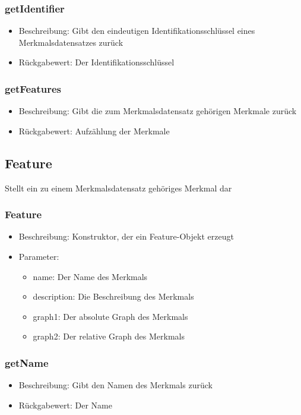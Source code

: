 \documentclass[a4paper]{scrreprt}
\begin{document}
	\subsubsection{getIdentifier}
	\begin{itemize}
		\item Beschreibung: Gibt den eindeutigen Identifikationsschlüssel eines Merkmalsdatensatzes zurück
		\item Rückgabewert: Der Identifikationsschlüssel
	\end{itemize}
	\subsubsection{getFeatures}
	\begin{itemize}
		\item Beschreibung: Gibt die zum Merkmalsdatensatz gehörigen Merkmale zurück
		\item Rückgabewert: Aufzählung der Merkmale
	\end{itemize}
	
	\subsection{Feature}
	Stellt ein zu einem Merkmalsdatensatz gehöriges Merkmal dar
	\subsubsection{Feature}
		\begin{itemize}
		\item Beschreibung: Konstruktor, der ein Feature-Objekt erzeugt
		\item Parameter: 
		\begin{itemize}
		\item name: Der Name des Merkmals
		\item description: Die Beschreibung des Merkmals
		\item graph1: Der absolute Graph des Merkmals
		\item graph2: Der relative Graph des Merkmals
		\end{itemize}	
		\end{itemize}
	\subsubsection{getName}
	\begin{itemize}
		\item Beschreibung: Gibt den Namen des Merkmals zurück
		\item Rückgabewert: Der Name
	\end{itemize}
\end{document}
